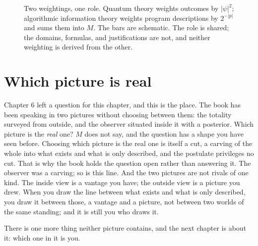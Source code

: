 \begin{figure}[h]
\centering
{}
\caption{Two weightings, one role. Quantum theory weights outcomes by $|\psi|^2$; algorithmic information theory weights program descriptions by $2^{-|p|}$ and sums them into $M$. The bars are schematic. The role is shared; the domains, formulas, and justifications are not, and neither weighting is derived from the other.}
\label{fig:born-prior}
\end{figure}
\FloatBarrier

\section*{Which picture is real}

Chapter 6 left a question for this chapter, and this is the place. The book has been speaking in two pictures without choosing between them: the totality surveyed from outside, and the observer situated inside it with a posterior. Which picture is the \emph{real} one? $M$ does not say, and the question has a shape you have seen before. Choosing which picture is the real one is itself a cut, a carving of the whole into what exists and what is only described, and the postulate privileges no cut. That is why the book holds the question open rather than answering it. The observer was a carving; so is this line. And the two pictures are not rivals of one kind. The inside view is a vantage you have; the outside view is a picture you drew. When you draw the line between what exists and what is only described, you draw it between those, a vantage and a picture, not between two worlds of the same standing; and it is still you who draws it.

There is one more thing neither picture contains, and the next chapter is about it: which one in it is you.

